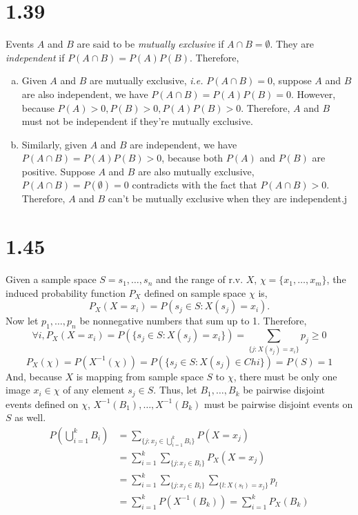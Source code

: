 \documentclass[letter]{article}
\begin{document}
    \section*{1.39}
    Events $A$ and $B$ are said to be \emph{mutually exclusive} if $A \cap B = \emptyset$. They are \emph{independent} if $P(A\cap B) = P(A)P(B)$.
    Therefore,
    \begin{enumerate}[(a)]
        \item Given $A$ and $B$ are mutually exclusive, \emph{i.e.} $P(A \cap B) = 0$, suppose $A$ and $B$ are also independent, we have $P(A \cap B) = P(A)P(B) = 0$. However, because $P(A) > 0, P(B) > 0, P(A)P(B) > 0$. Therefore, $A$ and $B$ must not be independent if they're mutually exclusive.
        \item Similarly, given $A$ and $B$ are independent, we have $P(A \cap B) = P(A)P(B) > 0$, because both $P(A)$ and $P(B)$ are positive. Suppose $A$ and $B$ are also mutually exclusive, $P(A \cap B) = P(\emptyset) = 0$ contradicts with the fact that $P(A \cap B) > 0$. Therefore, $A$ and $B$ can't be mutually exclusive when they are independent.j
    \end{enumerate}
    \section*{1.45}
    Given a sample space $S= {s_1, \dots, s_n}$ and the range of r.v. $X$,
    $\chi = \{x_1, \dots, x_m\}$,
    the induced probability function $P_X$ defined on sample space $\chi$ is,
    \[
    P_X(X = x_i) = P({s_j \in S: X(s_j)=x_i}).
    \]
    Now let $p_1, \dots, p_n$ be nonnegative numbers that sum up to 1. 
    Therefore, 
    \[
    \forall i, P_X(X=x_i) = P(\{s_j \in S: X(s_j) = x_i\}) = \sum_{\{j:
    X(s_j) = x_i\}} p_j \geq 0
    \]
    \[
    P_X(\chi) = P(X^{-1}(\chi)) = P(\{s_j \in S: X(s_j) \in Chi\}) = P(S) = 1
    \]
    And, because $X$ is mapping from sample space $S$ to $\chi$, there must be
    only one image $x_i \in \chi$ of any element $s_j \in S$. Thus, let 
    $B_1, \dots, B_k$ be pairwise disjoint events defined on $\chi$, 
    $X^{-1}(B_1), \dots, X^{-1}(B_k)$ must be pairwise disjoint events on $S$
    as well. 
    \begin{align*}
    P(\bigcup_{i=1}^k B_i) & = \sum_{\{j:x_j \in \bigcup_{i=1}^k B_i\}} P(X=x_j)
    \\
    & = \sum_{i=1}^k \sum_{\{j:x_j \in B_i \}} P_X(X=x_j) \\
    & = \sum_{i=1}^k \sum_{\{j:x_j \in B_i \}} \sum_{\{l: X(s_l)
    = x_j\}} p_l \\
    & = \sum_{i=1}^k P(X^{-1}(B_k)) = \sum_{i=1}^k P_X(B_k)
    \end{align*}
    
\end{document}

